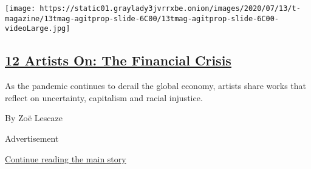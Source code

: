 \begin{enumerate}
  \texttt{[image: https://static01.graylady3jvrrxbe.onion/images/2020/07/13/t-magazine/13tmag-agitprop-slide-6C00/13tmag-agitprop-slide-6C00-videoLarge.jpg]}

  \hypertarget{12-artists-on-the-financial-crisis}{%
  \subsection{\texorpdfstring{\href{/2020/07/21/t-magazine/art-financial-crisis.html}{12
  Artists On: The Financial
  Crisis}}{12 Artists On: The Financial Crisis}}\label{12-artists-on-the-financial-crisis}}

  As the pandemic continues to derail the global economy, artists share
  works that reflect on uncertainty, capitalism and racial injustice.

  By Zoë Lescaze
\end{enumerate}

Advertisement

\protect\hyperlink{after-mid1}{Continue reading the main story}

\subsection{\texorpdfstring{\protect\hyperlink{}{}}{}}

